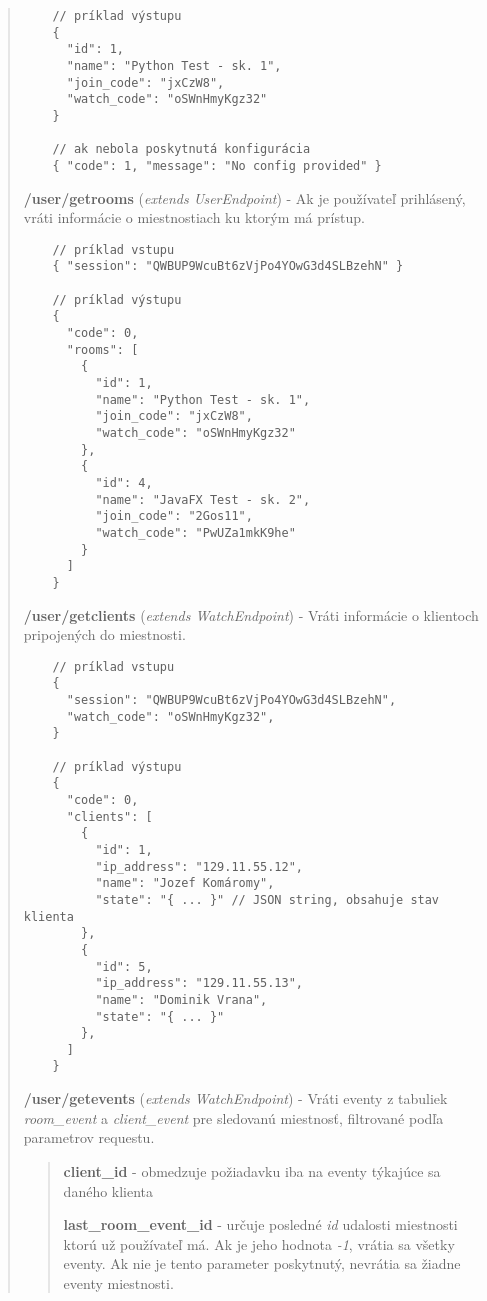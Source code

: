 \documentclass{article}
\newcommand{\filedesc}[1]{\vspace{0.3cm} \noindent \textbf{#1}}
\begin{document}
\begin{quote}
\begin{verbatim}
    // príklad výstupu
    {
      "id": 1,
      "name": "Python Test - sk. 1",
      "join_code": "jxCzW8",
      "watch_code": "oSWnHmyKgz32"
    }

    // ak nebola poskytnutá konfigurácia
    { "code": 1, "message": "No config provided" }
  \end{verbatim}

  
  \filedesc{/user/getrooms} (\emph{extends UserEndpoint}) - Ak je používateľ prihlásený, vráti informácie o miestnostiach ku ktorým má prístup.

  \begin{verbatim}
    // príklad vstupu
    { "session": "QWBUP9WcuBt6zVjPo4YOwG3d4SLBzehN" } 

    // príklad výstupu
    {
      "code": 0,
      "rooms": [
        {
          "id": 1,
          "name": "Python Test - sk. 1",
          "join_code": "jxCzW8",
          "watch_code": "oSWnHmyKgz32"
        },
        {
          "id": 4,
          "name": "JavaFX Test - sk. 2",
          "join_code": "2Gos11",
          "watch_code": "PwUZa1mkK9he"
        }
      ]
    }
  \end{verbatim}
  
  \filedesc{/user/getclients} (\emph{extends WatchEndpoint}) - Vráti informácie o klientoch pripojených do miestnosti.

  \begin{verbatim}
    // príklad vstupu
    {
      "session": "QWBUP9WcuBt6zVjPo4YOwG3d4SLBzehN",
      "watch_code": "oSWnHmyKgz32",
    }

    // príklad výstupu
    {
      "code": 0,
      "clients": [
        {
          "id": 1,
          "ip_address": "129.11.55.12",
          "name": "Jozef Komáromy",
          "state": "{ ... }" // JSON string, obsahuje stav klienta
        },
        {
          "id": 5,
          "ip_address": "129.11.55.13",
          "name": "Dominik Vrana",
          "state": "{ ... }"
        },
      ]
    }
  \end{verbatim}
  
  \filedesc{/user/getevents} (\emph{extends WatchEndpoint}) - Vráti eventy z tabuliek \emph{room{\_}event} a \emph{client{\_}event} pre sledovanú miestnosť, filtrované podľa parametrov requestu. 
  \begin{quote}
  \filedesc{client{\_}id} - obmedzuje požiadavku iba na eventy týkajúce sa daného klienta

  \filedesc{last{\_}room{\_}event{\_}id} - určuje posledné \emph{id} udalosti miestnosti ktorú už používateľ má. Ak je jeho hodnota \emph{-1}, vrátia sa všetky eventy. Ak nie je tento parameter poskytnutý, nevrátia sa žiadne eventy miestnosti.


\end{quote}
\end{quote}
\end{document}
